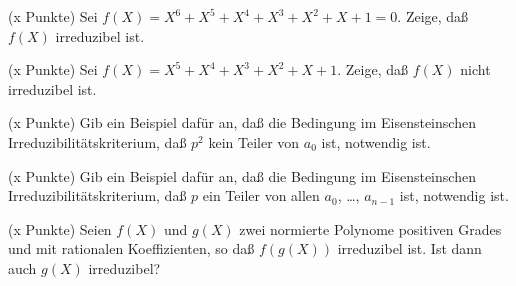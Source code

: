 \documentclass{algsheet}
\author{Dipl.-Math.~Arturo Mancino}
\date{08.~Dezember 2010}
\begin{document}
                \maketitle


\begin{exercise}(x Punkte)\newline
    Sei \(f(X) = X^6 + X^5 + X^4 + X^3 + X^2 + X + 1 = 0\). Zeige, daß
    \(f(X)\) irreduzibel ist.
\end{exercise}

\begin{exercise}(x Punkte)\newline
    Sei \(f(X) = X^5 + X^4 + X^3 + X^2 + X + 1\). Zeige, daß \(f(X)\) nicht
    irreduzibel ist.
\end{exercise}

\begin{exercise}(x Punkte)\newline
	Gib ein Beispiel dafür an, daß die Bedingung im
	Eisensteinschen Irreduzibilitätskriterium,
	daß \(p^2\) kein Teiler von \(a_0\) ist, notwendig ist.
\end{exercise}

\begin{exercise}(x Punkte)\newline
	Gib ein Beispiel dafür an, daß die Bedingung im
	Eisensteinschen Irreduzibilitätskriterium,
	daß \(p\) ein Teiler von allen \(a_0\), \dots, \(a_{n - 1}\) ist,
	notwendig ist. 
\end{exercise}

\begin{exercise}(x Punkte)\newline
    Seien \(f(X)\) und \(g(X)\) zwei normierte Polynome positiven Grades
    und mit rationalen Koeffizienten, so daß \(f(g(X))\) irreduzibel ist.
    Ist dann auch \(g(X)\) irreduzibel?
\end{exercise}
\end{document}
